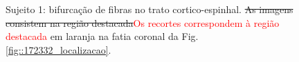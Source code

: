  \begin{figure}[H]
\centering
    \hfill
    \caption{Sujeito 1: bifurcação de fibras no trato cortico-espinhal. \sout{As imagens consistem na região destacada}\textcolor{red}{Os recortes correspondem à região destacada} em laranja na fatia coronal da Fig. \ref{fig::172332_localizacao}.
    }
    \label{fig::172332_fanning}
\end{figure}


